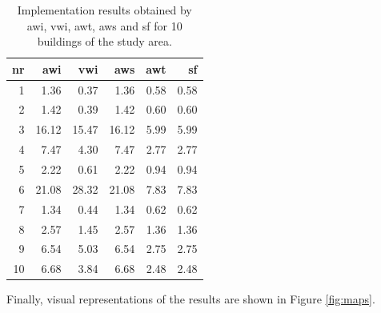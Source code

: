 \begin{table}

\caption{\label{tab:rtbl-ltx}Implementation results obtained by awi, vwi, awt, aws and sf for 10 buildings of the study area.}
\centering
\fontsize{7}{9}\selectfont
\begin{tabular}[t]{r|r|r|r|r|r}
\hline
nr & awi & vwi & aws & awt & sf\\
\hline
1 & 1.36 & 0.37 & 1.36 & 0.58 & 0.58\\
\hline
2 & 1.42 & 0.39 & 1.42 & 0.60 & 0.60\\
\hline
3 & 16.12 & 15.47 & 16.12 & 5.99 & 5.99\\
\hline
4 & 7.47 & 4.30 & 7.47 & 2.77 & 2.77\\
\hline
5 & 2.22 & 0.61 & 2.22 & 0.94 & 0.94\\
\hline
6 & 21.08 & 28.32 & 21.08 & 7.83 & 7.83\\
\hline
7 & 1.34 & 0.44 & 1.34 & 0.62 & 0.62\\
\hline
8 & 2.57 & 1.45 & 2.57 & 1.36 & 1.36\\
\hline
9 & 6.54 & 5.03 & 6.54 & 2.75 & 2.75\\
\hline
10 & 6.68 & 3.84 & 6.68 & 2.48 & 2.48\\
\hline
\end{tabular}
\end{table}

Finally, visual representations of the results are shown in Figure \ref{fig:maps}.

